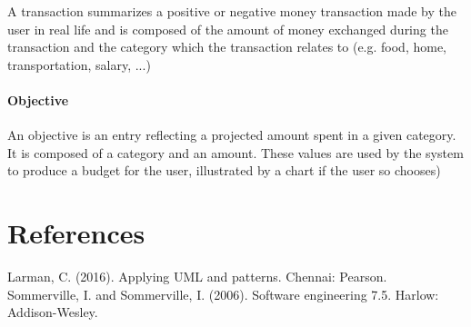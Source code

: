 \documentclass[letterpaper]{article}
\begin{document}
		A transaction summarizes a positive or negative money transaction made by the user in real life and is composed of the amount of money exchanged during the transaction and the category which the transaction relates to (e.g. food, home, transportation, salary, ...)
		
	\paragraph{Objective}
		
		An objective is an entry reflecting a projected amount spent in a given category. It is composed of a category and an amount. These values are used by the system to produce a budget for the user, illustrated by a chart if the user so chooses)
	

\newpage

\section{References}

    Larman, C. (2016). Applying UML and patterns. Chennai: Pearson.\\
    Sommerville, I. and Sommerville, I. (2006). Software engineering 7.5. Harlow: Addison-Wesley.\\

	
\end{document}

